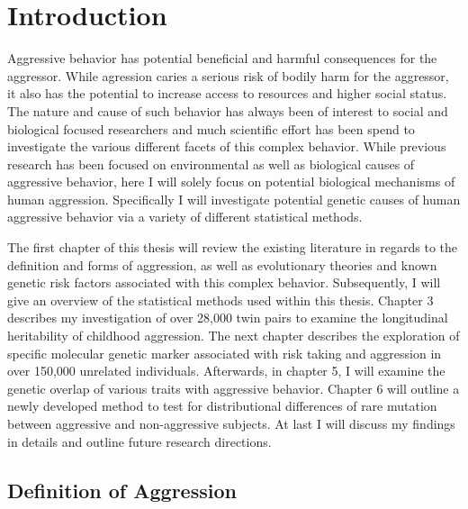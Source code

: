 \chapter{Introduction}
\label{cha:introduction}

Aggressive behavior has potential beneficial and harmful consequences for the aggressor.
While agression caries a serious risk of bodily harm for the aggressor, it also has the potential to increase access to resources and higher social status.
The nature and cause of such behavior has always been of interest to social and biological focused researchers and much scientific effort has been spend to investigate the various different facets of this complex behavior.
While previous research has been focused on environmental as well as biological causes of aggressive behavior, here I will solely focus on potential biological mechanisms of human aggression.
Specifically I will investigate potential genetic causes of human aggressive behavior via a variety of different statistical methods.

The first chapter of this thesis will review the existing literature in regards to the definition and forms of aggression, as well as evolutionary theories and known genetic risk factors associated with this complex behavior.
Subsequently, I will give an overview of the statistical methods used within this thesis.
Chapter 3 describes my investigation of over 28,000 twin pairs to examine the longitudinal heritability of childhood aggression.
The next chapter describes the exploration of specific molecular genetic marker associated with risk taking and aggression in over 150,000 unrelated individuals.
Afterwards, in chapter 5, I will examine the genetic overlap of various traits with aggressive behavior.
Chapter 6 will outline a newly developed method to test for distributional differences of rare mutation between aggressive and non-aggressive subjects.
At last I will discuss my findings in details and outline future research directions.

\section{Definition of Aggression}
\label{sec:overview_of_reseach_in_aggression}

